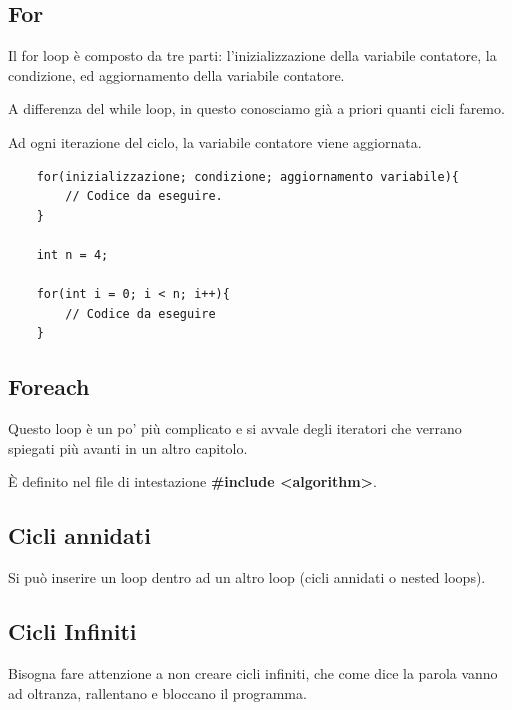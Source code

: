 \subsection{For}

\textsf{\small Il for loop è composto da tre parti: l'inizializzazione della variabile contatore, la condizione, ed aggiornamento della variabile contatore. }

\textsf{\small A differenza del while loop, in questo conosciamo già a priori quanti cicli faremo.}

\textsf{\small Ad ogni iterazione del ciclo, la variabile contatore viene aggiornata.} \\

\begin{lstlisting}
	for(inizializzazione; condizione; aggiornamento variabile){
		// Codice da eseguire.
	}

	int n = 4;
	
	for(int i = 0; i < n; i++){
		// Codice da eseguire
	}
\end{lstlisting}

\subsection{Foreach}


\textsf{\small Questo loop è un po' più complicato e si avvale degli iteratori che verrano spiegati più avanti in un altro capitolo.} %

\textsf{\small È definito nel file di intestazione \textbf{\#include <algorithm>}.} \\

\subsection{Cicli annidati}

\textsf{\small Si può inserire un loop dentro ad un altro loop (cicli annidati o nested loops).} \\

\subsection{Cicli Infiniti}

\textsf{\small Bisogna fare attenzione a non creare cicli infiniti, che come dice la parola vanno ad oltranza, rallentano e bloccano il programma.}\\

